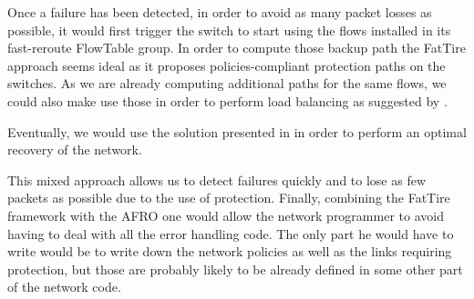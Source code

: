 \documentclass[final]{IEEEtran}
\begin{document}
Once a failure has been detected, in order to avoid as many packet losses as possible, it would first trigger the switch to start using the flows installed in its fast-reroute FlowTable group. In order to compute those backup path the FatTire approach seems ideal \cite{Reitblatt:2013:FDF:2491185.2491187} as it proposes policies-compliant protection paths on the switches. As we are already computing additional paths for the same flows, we could also make use those in order to perform load balancing as suggested by \cite{Suchara:2011:NAJ:1993744.1993756}.

Eventually, we would use the solution presented in \cite{Kuzniar:2013:AFR:2491185.2491218} in order to perform an optimal recovery of the network.

This mixed approach allows us to detect failures quickly and to lose as few packets as possible due to the use of protection. Finally, combining the FatTire framework with the AFRO one would allow the network programmer to avoid having to deal with all the error handling code. The only part he would have to write would be to write down the network policies as well as the links requiring protection, but those are probably likely to be already defined in some other part of the network code.
\pagebreak

\nocite{*}

\end{document}
